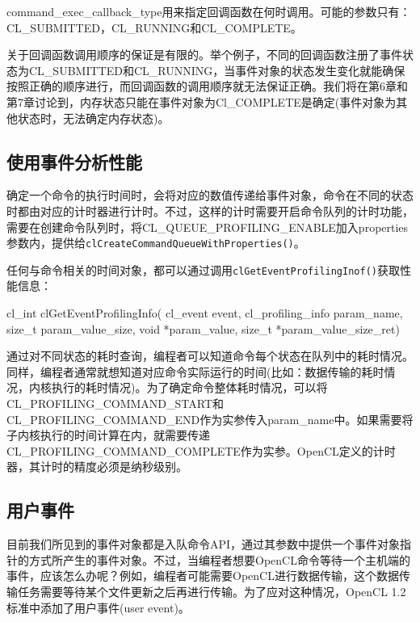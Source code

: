 command\_\allowbreak{}exec\_\allowbreak{}callback\_\allowbreak{}type用来指定回调函数在何时调用。可能的参数只有：CL\_\allowbreak{}SUBMITTED，CL\_\allowbreak{}RUNNING和CL\_\allowbreak{}COMPLETE。

关于回调函数调用顺序的保证是有限的。举个例子，不同的回调函数注册了事件状态为CL\_\allowbreak{}SUBMITTED和CL\_\allowbreak{}RUNNING，当事件对象的状态发生变化就能确保按照正确的顺序进行，而回调函数的调用顺序就无法保证正确。我们将在第6章和第7章讨论到，内存状态只能在事件对象为Cl\_\allowbreak{}COMPLETE是确定(事件对象为其他状态时，无法确定内存状态)。

\subsection{使用事件分析性能}

确定一个命令的执行时间时，会将对应的数值传递给事件对象，命令在不同的状态时都由对应的计时器进行计时。不过，这样的计时需要开启命令队列的计时功能，需要在创建命令队列时，将CL\_\allowbreak{}QUEUE\_\allowbreak{}PROFILING\_\allowbreak{}ENABLE加入properties参数内，提供给\texttt{clCreateCommandQueueWithProperties()}。

任何与命令相关的时间对象，都可以通过调用\texttt{clGetEventProfilingInof()}获取性能信息：

\begin{codebox}[cpp]
cl_int
clGetEventProfilingInfo(
  cl_event event,
  cl_profiling_info param_name,
  size_t param_value_size,
  void *param_value,
  size_t *param_value_size_ret)
\end{codebox}

通过对不同状态的耗时查询，编程者可以知道命令每个状态在队列中的耗时情况。同样，编程者通常就想知道对应命令实际运行的时间(比如：数据传输的耗时情况，内核执行的耗时情况)。为了确定命令整体耗时情况，可以将CL\_\allowbreak{}PROFILING\_\allowbreak{}COMMAND\_\allowbreak{}START和CL\_\allowbreak{}PROFILING\_\allowbreak{}COMMAND\_\allowbreak{}END作为实参传入param\_\allowbreak{}name中。如果需要将子内核执行的时间计算在内，就需要传递CL\_\allowbreak{}PROFILING\_\allowbreak{}COMMAND\_\allowbreak{}COMPLETE作为实参。OpenCL定义的计时器，其计时的精度必须是纳秒级别。

\subsection{用户事件}

目前我们所见到的事件对象都是入队命令API，通过其参数中提供一个事件对象指针的方式所产生的事件对象。不过，当编程者想要OpenCL命令等待一个主机端的事件，应该怎么办呢？例如，编程者可能需要OpenCL进行数据传输，这个数据传输任务需要等待某个文件更新之后再进行传输。为了应对这种情况，OpenCL 1.2标准中添加了用户事件(user event)。

